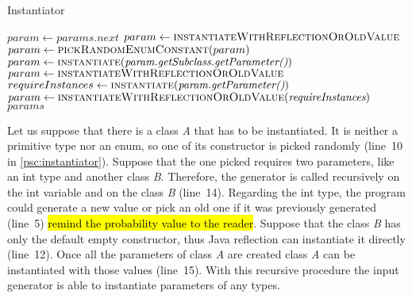 \begin{algorithm}
	\caption{Instantiator}\label{psc:instantiator}
	\begin{algorithmic}[1]
			\State $param \gets \textit{params.next}$
				\State $param \gets \Call{instantiateWithReflectionOrOldValue}{}$
				\State $param \gets \Call{pickRandomEnumConstant}{param}$
				\State $param \gets \Call{instantiate}{\textit{param.getSubclass.getParameter()}}$
			\Else 
					\State $param \gets \Call{instantiateWithReflectionOrOldValue}{}$
				\Else 
					\State $requireInstances \gets \Call{instantiate}{\textit{param.getParameter()}}$
					\State $param \gets \Call{instantiateWithReflectionOrOldValue}{\textit{requireInstances}}$
				\EndIf
			\EndIf	
		\EndFor
		\Return $params$ 
		\EndProcedure
	\end{algorithmic}
\end{algorithm}

Let us suppose that there is a class \textit{A} that has to be instantiated. It is neither a  primitive type nor an enum, so one of its constructor is picked randomly (line~10 in \autoref{psc:instantiator}). Suppose that the one picked requires two parameters, like an int type and another class \textit{B}. Therefore, the generator is called recursively on the int variable and on the class \textit{B} (line~14). Regarding the int type, the program could generate a new value or pick an old one if it was previously generated (line~5) \hl{remind the probability value to the reader}. Suppose that the class \textit{B} has only the default empty constructor, thus Java reflection can instantiate it directly (line~12). Once all the parameters of class \textit{A} are created class \textit{A} can be instantiated with those values (line~15). With this recursive procedure the input generator is able to instantiate parameters of any types.



